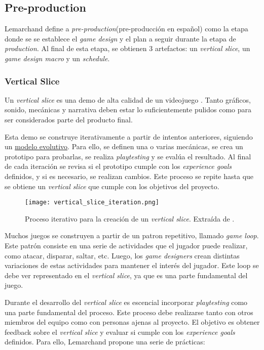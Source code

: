 \subsection{Pre-production}
\par Lemarchand define a \textit{pre-production}(pre-producción en español) como la etapa donde se se establece el \textit{game design} y el plan a seguir durante la etapa de \textit{production}. Al final de esta etapa, se obtienen 3 artefactos: un \textit{vertical slice}, un \textit{game design macro} y un \textit{schedule}. 
%
%
\subsubsection{Vertical Slice}
Un \textit{vertical slice} es una demo de alta calidad de un videojuego \cite{lemarchandPlayfulProductionProcess2021}. Tanto gráficos, sonido, mecánicas y narrativa deben estar lo suficientemente pulidos como para ser considerados parte del producto final. 
\par Esta demo se construye iterativamente a partir de intentos anteriores, siguiendo un \hyperref[sec:modelos_evolutivos]{modelo evolutivo}. Para ello, se definen una  o varias mecánicas, se crea un prototipo para probarlas, se realiza \textit{playtesting} y se evalúa el resultado. Al final de cada iteración se revisa si el prototipo cumple con los \textit{experience goals} definidos, y si es necesario, se realizan cambios. Este proceso se repite hasta que se obtiene un \textit{vertical slice} que cumple con los objetivos del proyecto.
\begin{figure}[h]
    \centering
    \texttt{[image: vertical\_slice\_iteration.png]}
    \caption{Proceso iterativo para la creación de un \textit{vertical slice}. Extraída de \cite{lemarchandPlayfulProductionProcess2021}.}
    \label{fig:x iteracion vertical slice}
\end{figure} 
\par Muchos juegos se construyen a partir de un patron repetitivo, llamado \textit{game loop}. Este patrón consiste en una serie de actividades que el jugador puede realizar, como atacar, disparar, saltar, etc. Luego, los \textit{game designers} crean distintas variaciones de estas actividades para mantener el interés del jugador. Este loop se debe ver representado en el \textit{vertical slice}, ya que es una parte fundamental del juego.
%
\par Durante el desarrollo del \textit{vertical slice} es escencial incorporar \textit{playtesting} como una parte fundamental del proceso. Este proceso debe realizarse tanto con otros miembros del equipo como con personas ajenas al proyecto. El objetivo es obtener feedback sobre el \textit{vertical slice} y evaluar si cumple con los \textit{experience goals} definidos. Para ello, Lemarchand propone una serie de prácticas:
